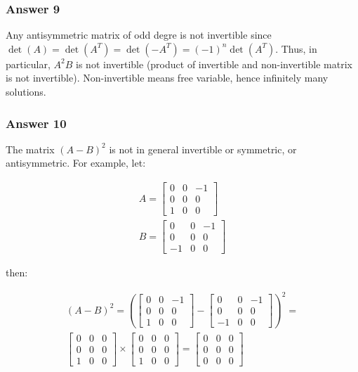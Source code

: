 \documentclass[11pt]{article}
\DeclareMathOperator{\det}{det}
\begin{document}
\subsubsection{Answer 9}
\label{sec:orgheadline15}
Any antisymmetric matrix of odd degre is not invertible since \(\det(A) =
    \det(A^T) = \det(-A^T) = (-1)^n\det(A^T)\).  Thus, in particular, \(A^2B\) is
not invertible (product of invertible and non-invertible matrix is not
invertible).  Non-invertible means free variable, hence infinitely many
solutions.

\subsubsection{Answer 10}
\label{sec:orgheadline16}
The matrix \((A - B)^2\) is not in general invertible or symmetric, or
antisymmetric.  For example, let:

\begin{align*}
  A = \begin{bmatrix}
    0 & 0 & -1 \\
    0 & 0 & 0 \\
    1 & 0 & 0
  \end{bmatrix} \\
  B = \begin{bmatrix}
    0  & 0 & -1 \\
    0  & 0 & 0 \\
    -1 & 0 & 0
  \end{bmatrix}
\end{align*}

then:

\begin{align*}
  (A - B)^2 = \left(\begin{bmatrix}
    0 & 0 & -1 \\
    0 & 0 & 0 \\
    1 & 0 & 0
  \end{bmatrix} -
  \begin{bmatrix}
    0  & 0 & -1 \\
    0  & 0 & 0 \\
    -1 & 0 & 0
  \end{bmatrix} \right)^2 = \\
  \begin{bmatrix}
    0 & 0 & 0 \\
    0 & 0 & 0 \\
    1 & 0 & 0
  \end{bmatrix} \times 
  \begin{bmatrix}
    0 & 0 & 0 \\
    0 & 0 & 0 \\
    1 & 0 & 0
  \end{bmatrix} = 
  \begin{bmatrix}
    0 & 0 & 0 \\
    0 & 0 & 0 \\
    0 & 0 & 0
  \end{bmatrix}
\end{align*}
\end{document}
